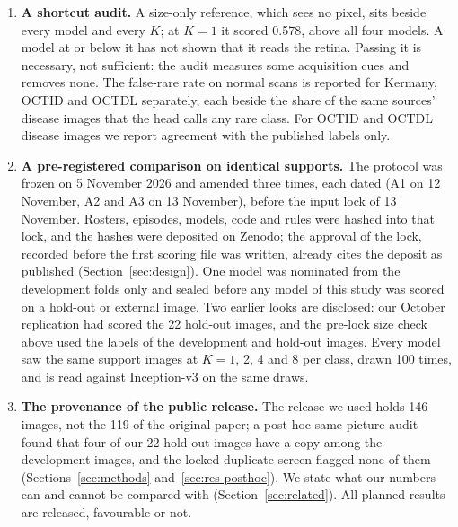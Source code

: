 \documentclass[conference]{IEEEtran}
\begin{document}
\begin{enumerate}
\item \textbf{A shortcut audit.} A size-only reference, which sees no pixel, sits beside every model and every $K$; at $K=1$ it scored 0.578, above all four models. A model at or below it has not shown that it reads the retina. Passing it is necessary, not sufficient: the audit measures some acquisition cues and removes none. The false-rare rate on normal scans is reported for Kermany, OCTID and OCTDL separately, each beside the share of the same sources' disease images that the head calls any rare class. For OCTID and OCTDL disease images we report agreement with the published labels only.
\item \textbf{A pre-registered comparison on identical supports.} The protocol was frozen on 5 November 2026 and amended three times, each dated (A1 on 12 November, A2 and A3 on 13 November), before the input lock of 13 November. Rosters, episodes, models, code and rules were hashed into that lock, and the hashes were deposited on Zenodo; the approval of the lock, recorded before the first scoring file was written, already cites the deposit as published (Section~\ref{sec:design}). One model was nominated from the development folds only and sealed before any model of this study was scored on a hold-out or external image. Two earlier looks are disclosed: our October replication had scored the 22 hold-out images, and the pre-lock size check above used the labels of the development and hold-out images. Every model saw the same support images at $K=1$, 2, 4 and 8 per class, drawn 100 times, and is read against Inception-v3 on the same draws.
\item \textbf{The provenance of the public release.} The release we used holds 146 images, not the 119 of the original paper; a post hoc same-picture audit found that four of our 22 hold-out images have a copy among the development images, and the locked duplicate screen flagged none of them (Sections~\ref{sec:methods} and~\ref{sec:res-posthoc}). We state what our numbers can and cannot be compared with (Section~\ref{sec:related}). All planned results are released, favourable or not.
\end{enumerate}
\end{document}
